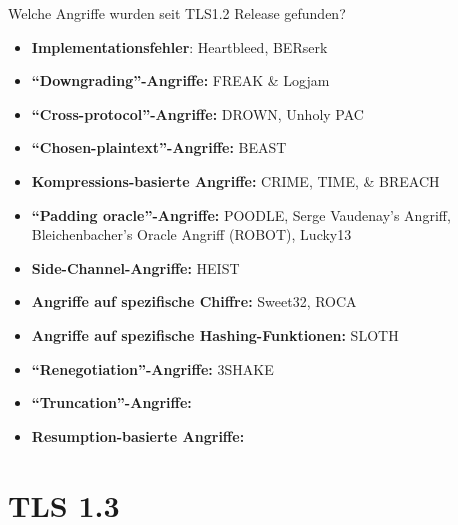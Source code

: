 \documentclass{f4_beamer_metropolis}
\begin{document}
\begin{frame}{Welche Angriffe wurden seit TLS1.2 Release gefunden?}
  \begin{itemize}
    \item \textbf{Implementationsfehler}: Heartbleed, BERserk
    \item \textbf{\enquote{Downgrading}-Angriffe:} FREAK \& Logjam
    \item \textbf{\enquote{Cross-protocol}-Angriffe:} DROWN, Unholy PAC
    \item \textbf{\enquote{Chosen-plaintext}-Angriffe:} BEAST
    \item \textbf{Kompressions-basierte Angriffe:} CRIME, TIME, \& BREACH
    \item \textbf{\enquote{Padding oracle}-Angriffe:} POODLE, Serge Vaudenay's Angriff, Bleichenbacher's Oracle Angriff (ROBOT), Lucky13
    \item \textbf{Side-Channel-Angriffe:} HEIST
    \item \textbf{Angriffe auf spezifische Chiffre:} Sweet32, ROCA
    \item \textbf{Angriffe auf spezifische Hashing-Funktionen:} SLOTH
    \item \textbf{\enquote{Renegotiation}-Angriffe:} 3SHAKE
    \item \textbf{\enquote{Truncation}-Angriffe:} 
    \item \textbf{Resumption-basierte Angriffe:} 
  \end{itemize}

\end{frame}

\section{TLS 1.3}
\end{document}
